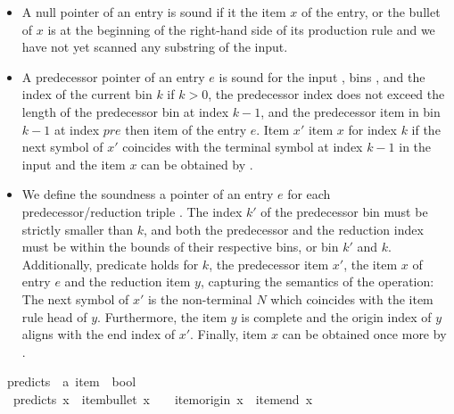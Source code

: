 \begin{isabellebody}
\begin{isamarkuptext}
\begin{itemize}
  \item A null pointer  of an entry is sound if it  the item $x$ of
    the entry, or the bullet of $x$ is at the beginning of the right-hand side of its production rule
    and we have not yet scanned any substring of the input.
  \item A predecessor pointer  of an entry $e$ is sound for the input \isa{{\isasymomega}}, bins ,
    and the index of the current bin $k$ if $k > 0$, the predecessor index does not exceed the length
    of the predecessor bin at index $k-1$, and the predecessor item in bin $k-1$ at index $pre$ 
    then item of the entry $e$. Item $x'$  item $x$ for index $k$ if the next symbol of
    $x'$ coincides with the terminal symbol at index $k-1$ in the input \isa{{\isasymomega}} and the item $x$ can be obtained
    by . 
  \item We define the soundness a pointer  of an entry $e$ for each predecessor/reduction
    triple . The index $k'$ of the predecessor bin must be strictly
    smaller than $k$, and both the predecessor and the reduction index must be within the bounds of their
    respective bins, or bin $k'$ and $k$. Additionally, predicate  holds for $k$,
    the predecessor item $x'$, the item $x$ of entry $e$ and the reduction item $y$, capturing the semantics of
    the  operation: The next symbol of $x'$ is the non-terminal $N$ which coincides
    with the item rule head of $y$. Furthermore, the item $y$ is complete and the origin index of $y$
    aligns with the end index of $x'$. Finally, item $x$ can be obtained once more by .
\end{itemize}%
\end{isamarkuptext}\isamarkuptrue%
\isamarkupfalse%
\ predicts\ {\isacharcolon}{\kern0pt}{\isacharcolon}{\kern0pt}\ {\isachardoublequoteopen}{\isacharprime}{\kern0pt}a\ item\ {\isasymRightarrow}\ bool{\isachardoublequoteclose}\ \isanewline
\ \ {\isachardoublequoteopen}predicts\ x\ {\isasymequiv}\ item{\isacharunderscore}{\kern0pt}bullet\ x\ {\isacharequal}{\kern0pt}\ {}\ {\isasymand}\ item{\isacharunderscore}{\kern0pt}origin\ x\ {\isacharequal}{\kern0pt}\ item{\isacharunderscore}{\kern0pt}end\ x{\isachardoublequoteclose}\isanewline

\end{isabellebody}
